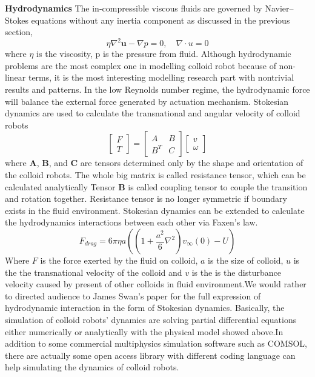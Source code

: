 \textbf{Hydrodynamics}  The in-compressible viscous fluids are governed by Navier–Stokes equations without any inertia component as discussed in the previous section,
\begin{equation}
    \eta \nabla^2\textbf{u}-\nabla p=0,\quad \nabla \cdot u=0
\end{equation}
where $\eta$ is the viscosity, p is the pressure from fluid. Although hydrodynamic problems are the most complex one in modelling colloid robot because of non-linear terms, it is the most interesting modelling research part with nontrivial results and patterns. \cite{Lauga2009,berke2008hydrodynamic,lauga2011life} In the low Reynolds number regime, the hydrodynamic force will balance the external force generated by actuation mechanism. Stokesian dynamics are used to calculate the transnational and angular velocity of colloid robots \cite{Brady1988a,Kim2005}
\begin{equation}
    \left[ \begin{array}{c} F \\ T \end{array} \right] = \begin{bmatrix} A & B \\ B^T & C \end{bmatrix} \left[ \begin{array}{c} v \\ \omega \end{array} \right]
\end{equation}
where \textbf{A}, \textbf{B}, and \textbf{C} are tensors determined only by the shape and orientation of the colloid robots. The whole big matrix is called resistance tensor, which can be calculated analytically\cite{Kim2005}  Tensor \textbf{B} is called coupling tensor to couple the transition and rotation together. Resistance tensor is no longer symmetric if boundary exists in the fluid environment.  Stokesian dynamics  can be extended to calculate the hydrodynamics interactions between each other via Faxen's law.
\begin{equation}
    F_{drag}=6 \pi \eta a((1+\frac{a^2}{6}\nabla^2)v_{\infty}(0)-U)
\end{equation}
Where $F$ is the   force exerted by the fluid on colloid, $a$ is the size of colloid, $u$ is the  the transnational  velocity of the colloid and $v$ is the is the disturbance velocity caused by present of other colloids in fluid environment.We would rather to directed audience to James Swan's paper for the full expression of hydrodynamic interaction in the form of Stokesian dynamics. \cite{swan2011modeling} Basically, the simulation of colloid robots' dynamics are solving partial differential equations either numerically or analytically with the physical model showed above.In addition to some commercial multiphysics simulation software such as COMSOL\textregistered, there are actually some open access library with different coding language  can help simulating the dynamics of colloid robots. \cite{glaser2015strong,anderson2008general,swan2011modeling,singh2019hydrodynamic}


